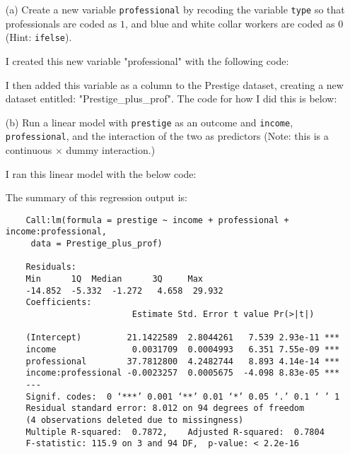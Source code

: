 \documentclass[12pt,letterpaper]{article}
\begin{document}
\newpage
\begin{enumerate}
	
	\item [(a)]
	Create a new variable \texttt{professional} by recoding the variable \texttt{type} so that professionals are coded as $1$, and blue and white collar workers are coded as $0$ (Hint: \texttt{ifelse}).
	\vspace{1cm}
	
	I created this new variable "professional" with the following code:
	 
	
	I then added this variable as a column to the Prestige dataset, creating a new dataset entitled: "Prestige\_plus\_prof". The code for how I did this is below:
	 
	
	\vspace{1cm}
	
	
	\item [(b)]
	Run a linear model with \texttt{prestige} as an outcome and \texttt{income}, \texttt{professional}, and the interaction of the two as predictors (Note: this is a continuous $\times$ dummy interaction.)
	
	I ran this linear model with the below code:
	
	
	The summary of this regression output is:
	\begin{verbatim}
	Call:lm(formula = prestige ~ income + professional + income:professional,    
	 data = Prestige_plus_prof)
	
	Residuals:    
	Min      1Q  Median      3Q     Max 
	-14.852  -5.332  -1.272   4.658  29.932
	Coefficients:                      
	                     Estimate Std. Error t value Pr(>|t|)    
	             
	(Intercept)         21.1422589  2.8044261   7.539 2.93e-11 ***
	income               0.0031709  0.0004993   6.351 7.55e-09 ***
	professional        37.7812800  4.2482744   8.893 4.14e-14 ***
	income:professional -0.0023257  0.0005675  -4.098 8.83e-05 ***
	---
	Signif. codes:  0 ‘***’ 0.001 ‘**’ 0.01 ‘*’ 0.05 ‘.’ 0.1 ‘ ’ 1
	Residual standard error: 8.012 on 94 degrees of freedom  
	(4 observations deleted due to missingness)
	Multiple R-squared:  0.7872,	Adjusted R-squared:  0.7804 
	F-statistic: 115.9 on 3 and 94 DF,  p-value: < 2.2e-16
	\end{verbatim} 
	

\end{enumerate}
\end{document}

